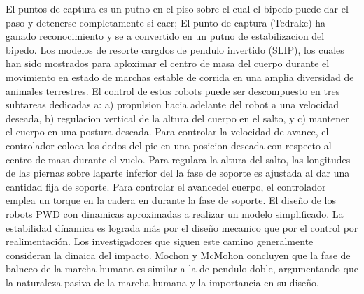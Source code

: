 \documentclass[10pt,onecolumn,twoside,letterpaper]{article}
\begin{document}
{%
}\cite{Grizzle2014}
El puntos de captura es un putno en el piso sobre el cual el bipedo puede dar el paso y detenerse completamente si caer; El punto de captura (Tedrake) ha ganado reconocimiento y se a convertido en un putno de estabilizacion del bipedo. Los modelos de resorte cargdos de pendulo invertido (SLIP), los cuales han sido mostrados para aploximar el centro de masa del cuerpo durante el movimiento en estado de marchas estable de corrida en una amplia diversidad de animales terrestres. El control de estos robots puede ser descompuesto en tres subtareas dedicadas a: a) propulsion hacia adelante del robot a una velocidad deseada, b) regulacion vertical de la altura del cuerpo en el salto, y c) mantener el cuerpo en una postura deseada. Para controlar la velocidad de avance, el controlador coloca los dedos del pie en una posicion deseada con respecto al centro de masa durante el vuelo. Para regulara la altura del salto, las longitudes de las piernas sobre laparte inferior del la fase de soporte es ajustada al dar una cantidad fija de soporte. Para controlar el avancedel cuerpo, el controlador emplea un torque en la cadera en durante la fase de soporte. El dise\~no de los robots PWD con dinamicas aproximadas a realizar un modelo simplificado. La estabilidad d\'inamica es lograda m\'as por el dise\~no mecanico que por el control por realimentaci\'on. Los investigadores que siguen este camino generalmente consideran la dinaica del impacto. Mochon y McMohon concluyen que la fase de balnceo de la marcha humana es similar a la de pendulo doble, argumentando que la naturaleza pasiva de la marcha humana y la importancia en su dise\~no.\cite{Grizzle2014}\\
\end{document}
